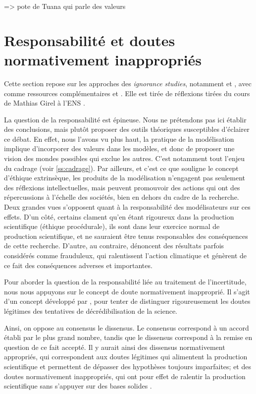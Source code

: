 \cite{helgeson_attention_2022} => pote de Tuana qui parle des valeurs

\section{Responsabilité et doutes normativement inappropriés}

Cette section repose sur les approches des \textit{ignorance studies}, notamment \cite{melo-martin_fight_2018} et \cite{gross_routledge_2015}, avec comme ressources complémentaires \cite{noauthor_carnet_2024} et \cite{proctor_agnotology_2008}. Elle est tirée de réflexions tirées du cours de Mathias Girel à l'ENS \cite{girel_vertus_2023}. 



La question de la responsabilité est épineuse. Nous ne prétendons pas ici établir des conclusions, mais plutôt proposer des outils théoriques susceptibles d'éclairer ce débat. En effet, nous l'avons vu plus haut, la pratique de la modélisation implique d'incorporer des valeurs dans les modèles, et donc de proposer une vision des mondes possibles qui exclue les autres. C'est notamment tout l'enjeu du cadrage (voir \ref{ss:cadrage}). Par ailleurs, et c'est ce que souligne le concept d'éthique extrinsèque, les produits de la modélisation n'engagent pas seulement des réflexions intellectuelles, mais peuvent promouvoir des actions qui ont des répercussions à l'échelle des sociétés, bien en dehors du cadre de la recherche. Deux grandes vues s'opposent quant à la responsabilité des modélisateurs sur ces effets. D'un côté, certains clament qu'en étant rigoureux dans la production scientifique (éthique procédurale), ils sont dans leur exercice normal de production scientifique, et ne sauraient être tenus responsables des conséquences de cette recherche. D'autre, au contraire, dénoncent des résultats parfois considérés comme frauduleux, qui ralentissent l'action climatique et génèrent de ce fait des conséquences adverses et importantes. 

Pour aborder la question de la responsabilité liée au  traitement de l'incertitude, nous nous appuyons sur le concept de doute normativement inapproprié. Il s'agit d'un concept développé par \textcite{melo-martin_fight_2018}, pour tenter de distinguer rigoureusement les doutes légitimes des tentatives de décrédibilisation de la science. 

Ainsi, on oppose au consensus le dissensus. Le consensus correspond à un accord établi par le plus grand nombre, tandis que le dissensus correspond à la remise en question de ce fait accepté. Il y aurait ainsi des dissensus normativement appropriés, qui correspondent aux doutes légitimes qui alimentent la production scientifique et permettent de dépasser des hypothèses toujours imparfaites; et des doutes normativement inappropriés, qui ont pour effet de ralentir la production scientifique sans s'appuyer sur des bases solides \autocite{benalloua_polemique_2023}. 

